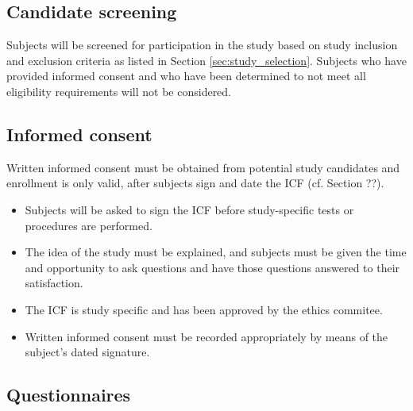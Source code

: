 
\subsection{Candidate screening}
\label{subsec:screening}
Subjects will be screened for participation in the study based on study inclusion and exclusion criteria as listed in Section \ref{sec:study_selection}. Subjects who have provided informed consent and who have been determined to not meet all eligibility requirements will not be considered.

\subsection{Informed consent}
Written informed consent must be obtained from potential study candidates and enrollment is only valid, after subjects sign and date the \ac{ICF} (cf. Section ??).
\begin{itemize}[noitemsep, topsep=0pt]
\item Subjects will be asked to sign the \ac{ICF} before study-specific tests or procedures are performed.
\item The idea of the study must be explained, and subjects must be given the time and opportunity to ask questions and have those questions answered to their satisfaction.
\item The \ac{ICF} is study specific and has been approved by the ethics commitee.
\item Written informed consent must be recorded appropriately by means of the subject’s dated signature.
\end{itemize}

\subsection{Questionnaires}
\label{subsec:questionnaires}
